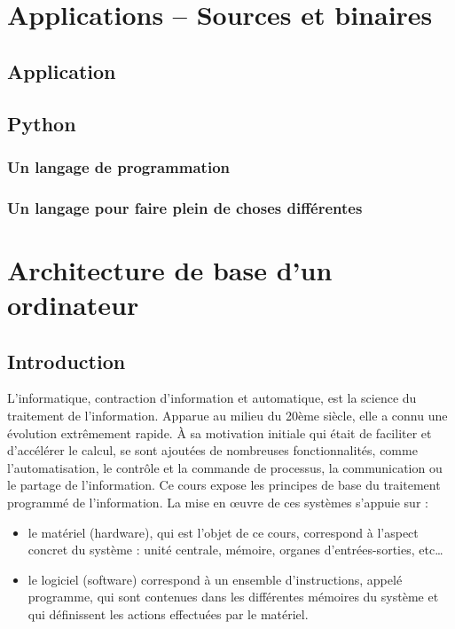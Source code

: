 \section{Applications -- Sources et binaires}
\subsection{Application}

\subsection{Python}
\subsubsection{Un langage de programmation}

\subsubsection{Un langage pour faire plein de choses différentes}

\newpage
\section{Architecture de base d'un ordinateur}
\subsection{Introduction}
L'informatique, contraction d'information et automatique, est la science du traitement de l'information. Apparue au milieu du 20ème siècle, elle a connu une évolution extrêmement rapide. À sa motivation initiale qui était de faciliter et d'accélérer le calcul, se sont ajoutées de nombreuses fonctionnalités, comme l'automatisation, le contrôle et la commande de processus, la communication ou le partage de l'information.
Ce cours expose les principes de base du traitement programmé de l’information. La mise en œuvre de ces systèmes s’appuie sur :
\begin{itemize}
\item le matériel (hardware), qui est l’objet de ce cours, correspond à l’aspect concret du système : unité centrale, mémoire, organes d’entrées-sorties, etc…
\item le logiciel (software) correspond à un ensemble d’instructions, appelé programme, qui sont contenues dans les différentes mémoires du système et qui définissent les actions effectuées par le matériel.
\end{itemize}


